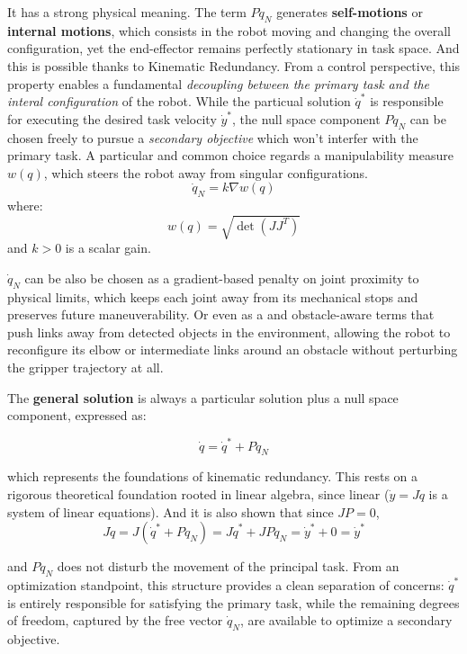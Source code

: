 It has a strong physical meaning. The term $P\dot{q}_N$ generates \textbf{self-motions} or \textbf{internal motions}, which consists in the robot moving and changing the overall configuration, 
yet the end-effector remains perfectly stationary in task space. And this is possible thanks to Kinematic Redundancy.
From a control perspective, this property enables a fundamental \textit{decoupling between the primary task and the interal configuration} of the robot. While the particual
solution $\dot{q}^*$ is responsible for executing the desired task velocity $\dot{y}^*$, the null space component $P\dot{q}_N$ can be chosen freely to pursue a \textit{secondary objective}
which won't interfer with the primary task. A particular and common choice regards a manipulability measure $w(q)$, which steers the robot away from singular configurations.
\begin{equation}
    \dot{q}_N = k \nabla w(q)
\end{equation}
where:
\begin{equation}
    w(q) = \sqrt{\det(J J^T)}
\end{equation}
and $k > 0$ is a scalar gain.

$\dot{q}_N$ can be also be chosen as a gradient-based penalty on joint proximity 
to physical limits, which keeps each joint away from its mechanical stops and preserves future maneuverability. Or even as a and obstacle-aware terms that push
 links away from detected objects in the environment, allowing the robot to reconfigure its elbow or intermediate links around an obstacle 
 without perturbing the gripper trajectory at all.

The \textbf{general solution} is always a particular solution plus a null space component, expressed as:

\begin{equation}
    \dot{q} = \dot{q}^* + P \dot{q}_N \label{eq:IKProbSol}
\end{equation}

which represents the foundations of kinematic redundancy.
This rests on a rigorous theoretical foundation rooted in linear algebra, since linear ($\dot{y} = J\dot{q}$ is a system of linear equations). And it is also shown
that since $JP =0$, 
\begin{equation}
J\dot{q} = J(\dot{q}^* + P\dot{q}_N) = J\dot{q}^* + JP\dot{q}_N = \dot{y}^* + 0 = \dot{y}^*    
\end{equation}

and $P\dot{q}_N$ does not disturb the movement of the principal task.
From an optimization standpoint, this structure provides a clean separation of concerns: 
$\dot{q}^*$ is entirely responsible for satisfying the primary task, while the remaining degrees of freedom, captured by the free vector $\dot{q}_N$,
are available to optimize a secondary objective.

